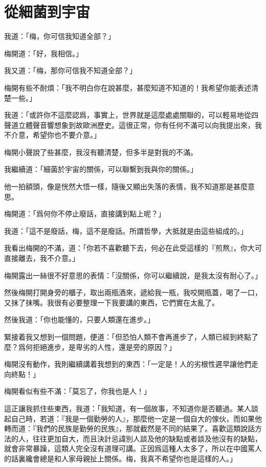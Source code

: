 \chapter{從細菌到宇宙}
我道：「梅，你可信我知道全部？」

梅開道：「好，我相信。」

我又道：「梅，那你可信我不知道全部？」

梅開有些不耐煩：「我不明白你在說甚麼，甚麼知道不知道的！我希望你能表述清楚一些。」

我道：「或許你不這麼認爲，事實上，世界就是這麼處處關聯的，可以輕易地從四聲道立體聲音響想象到故歐洲歷史。這很正常，你有任何不滿可以向我提出來，我不介意，希望你也不要介意。」

梅開小聲說了些甚麼，我沒有聽清楚，但多半是對我的不滿。

我繼續道：「細菌於宇宙的關係，可以聯繫到我與你的關係。」

他一拍額頭，像是恍然大悟一樣，隨後又顯出失落的表情，我不知道那是甚麼意思。

梅開道：「爲何你不停止廢話，直接講到點上呢？」

我道：「這不是廢話，梅，這不是廢話。所謂哲學，大抵就是由這些組成的。」

我看出梅開的不滿，道：「你若不喜歡聽下去，何必在此受這樣的『煎熬』，你大可直接離去，我不介意。」

梅開露出一絲很不好意思的表情：「沒關係，你可以繼續說，是我太沒有耐心了。」

然後梅開打開身旁的櫃子，取出兩瓶酒來，遞給我一瓶，我咬開瓶蓋，喝了一口，又抹了抹嘴。我很有必要整理一下我要講的東西，它們實在太亂了。

然後我道：「你也能懂的，只要人類還在進步。」

緊接着我又想到一個問題，便道：「但恐怕人類不會再進步了，人類已經到終點了麼？爲何拒絕進步，是卑劣的人性，還是旁的原因？」

梅開沒有動作，我則繼續講着我想到的東西：「一定是！人的劣根性遲早讓他們走向終點！」

梅開看似有些不滿：「莫忘了，你我也是人！」

這正讓我抓住些東西，我道：「我知道，有一個故事，不知道你是否聽過。某人談起自己時，若道：『我是一個勤勞的人』，那麼他一定是一個自大的傢伙，而如果他轉而道：『我們的民族是勤勞的民族』，那就截然是不同的結果了。喜歡這類說話方法的人，往往更加自大，而且決計忌諱別人談及他的缺點或者談及他沒有的缺點，就會非常暴躁，這類人完全沒有道理可講。正因爲這種人太多了，所以在中國罵人的話裏纔會總是和人家母親扯上關係。梅，我真不希望你也是這樣的人。」

